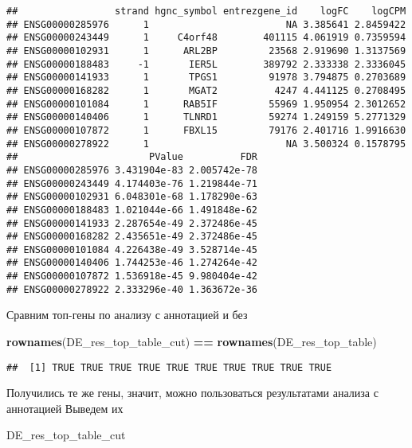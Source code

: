 \documentclass[
]{article}
\newenvironment{Shaded}{\begin{snugshade}}{\end{snugshade}}
\newcommand{\KeywordTok}[1]{\textcolor[rgb]{0.13,0.29,0.53}{\textbf{#1}}}
\newcommand{\NormalTok}[1]{#1}
\newcommand{\OperatorTok}[1]{\textcolor[rgb]{0.81,0.36,0.00}{\textbf{#1}}}
\newcommand{\StringTok}[1]{\textcolor[rgb]{0.31,0.60,0.02}{#1}}
\begin{document}
\begin{verbatim}
##                 strand hgnc_symbol entrezgene_id    logFC    logCPM
## ENSG00000285976      1                        NA 3.385641 2.8459422
## ENSG00000243449      1     C4orf48        401115 4.061919 0.7359594
## ENSG00000102931      1      ARL2BP         23568 2.919690 1.3137569
## ENSG00000188483     -1       IER5L        389792 2.333338 2.3336045
## ENSG00000141933      1       TPGS1         91978 3.794875 0.2703689
## ENSG00000168282      1       MGAT2          4247 4.441125 0.2708495
## ENSG00000101084      1      RAB5IF         55969 1.950954 2.3012652
## ENSG00000140406      1      TLNRD1         59274 1.249159 5.2771329
## ENSG00000107872      1      FBXL15         79176 2.401716 1.9916630
## ENSG00000278922      1                        NA 3.500324 0.1578795
##                       PValue          FDR
## ENSG00000285976 3.431904e-83 2.005742e-78
## ENSG00000243449 4.174403e-76 1.219844e-71
## ENSG00000102931 6.048301e-68 1.178290e-63
## ENSG00000188483 1.021044e-66 1.491848e-62
## ENSG00000141933 2.287654e-49 2.372486e-45
## ENSG00000168282 2.435651e-49 2.372486e-45
## ENSG00000101084 4.226438e-49 3.528714e-45
## ENSG00000140406 1.744253e-46 1.274264e-42
## ENSG00000107872 1.536918e-45 9.980404e-42
## ENSG00000278922 2.333296e-40 1.363672e-36
\end{verbatim}

Сравним топ-гены по анализу с аннотацией и без

\begin{Shaded}
\begin{Highlighting}[]
\KeywordTok{rownames}\NormalTok{(DE_res_top_table_cut) }\OperatorTok{==}\StringTok{ }\KeywordTok{rownames}\NormalTok{(DE_res_top_table)}
\end{Highlighting}
\end{Shaded}

\begin{verbatim}
##  [1] TRUE TRUE TRUE TRUE TRUE TRUE TRUE TRUE TRUE TRUE
\end{verbatim}

Получились те же гены, значит, можно пользоваться результатами анализа с
аннотацией Выведем их

\begin{Shaded}
\begin{Highlighting}[]
\NormalTok{DE_res_top_table_cut}
\end{Highlighting}
\end{Shaded}
\end{document}
